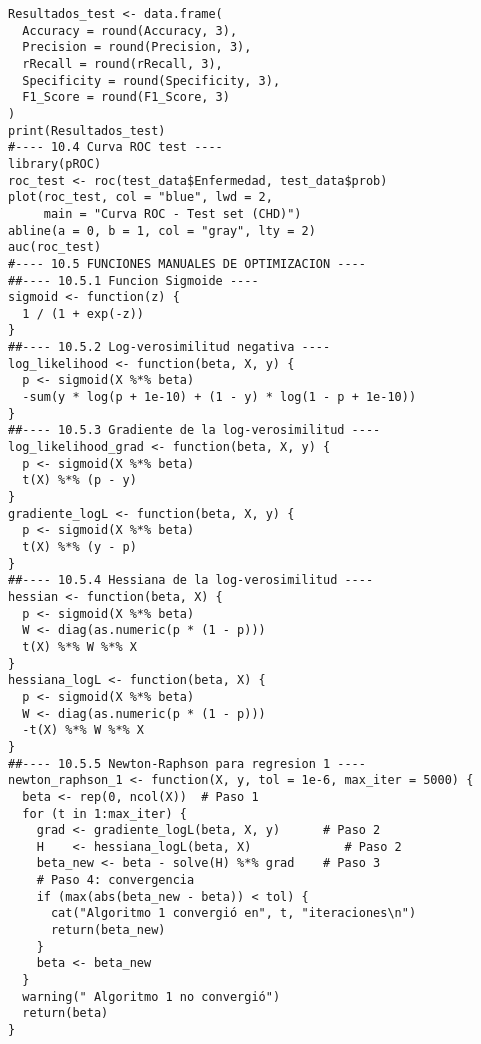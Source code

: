\documentclass[12pt]{article}
\begin{document}
\begin{verbatim}
Resultados_test <- data.frame(
  Accuracy = round(Accuracy, 3),
  Precision = round(Precision, 3),
  rRecall = round(rRecall, 3),
  Specificity = round(Specificity, 3),
  F1_Score = round(F1_Score, 3)
)
print(Resultados_test)
#---- 10.4 Curva ROC test ----
library(pROC)
roc_test <- roc(test_data$Enfermedad, test_data$prob)
plot(roc_test, col = "blue", lwd = 2,
     main = "Curva ROC - Test set (CHD)")
abline(a = 0, b = 1, col = "gray", lty = 2)
auc(roc_test)
#---- 10.5 FUNCIONES MANUALES DE OPTIMIZACION ----
##---- 10.5.1 Funcion Sigmoide ----
sigmoid <- function(z) {
  1 / (1 + exp(-z))
}
##---- 10.5.2 Log-verosimilitud negativa ----
log_likelihood <- function(beta, X, y) {
  p <- sigmoid(X %*% beta)
  -sum(y * log(p + 1e-10) + (1 - y) * log(1 - p + 1e-10))
}
##---- 10.5.3 Gradiente de la log-verosimilitud ----
log_likelihood_grad <- function(beta, X, y) {
  p <- sigmoid(X %*% beta)
  t(X) %*% (p - y)
}
gradiente_logL <- function(beta, X, y) {
  p <- sigmoid(X %*% beta)
  t(X) %*% (y - p)
}
##---- 10.5.4 Hessiana de la log-verosimilitud ----
hessian <- function(beta, X) {
  p <- sigmoid(X %*% beta)
  W <- diag(as.numeric(p * (1 - p)))
  t(X) %*% W %*% X
}
hessiana_logL <- function(beta, X) {
  p <- sigmoid(X %*% beta)
  W <- diag(as.numeric(p * (1 - p)))
  -t(X) %*% W %*% X
}
##---- 10.5.5 Newton-Raphson para regresion 1 ----
newton_raphson_1 <- function(X, y, tol = 1e-6, max_iter = 5000) {
  beta <- rep(0, ncol(X))  # Paso 1
  for (t in 1:max_iter) {
    grad <- gradiente_logL(beta, X, y)      # Paso 2
    H    <- hessiana_logL(beta, X)             # Paso 2
    beta_new <- beta - solve(H) %*% grad    # Paso 3
    # Paso 4: convergencia
    if (max(abs(beta_new - beta)) < tol) {
      cat("Algoritmo 1 convergió en", t, "iteraciones\n")
      return(beta_new)
    }
    beta <- beta_new
  }
  warning(" Algoritmo 1 no convergió")
  return(beta)
}


\end{verbatim}
\end{document}
